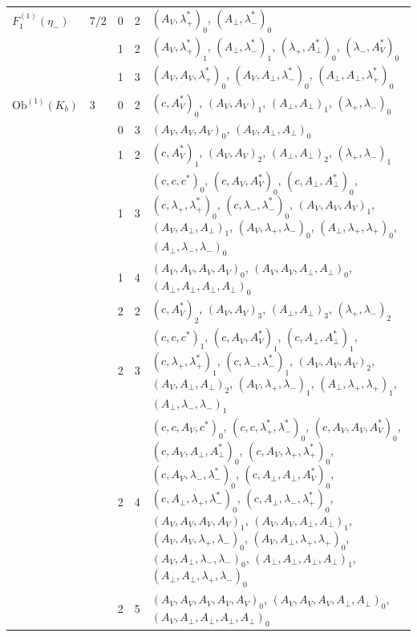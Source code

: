 \documentclass[11pt]{article}
\numberwithin{equation}{section}
\theoremstyle{plain}
\theoremstyle{definition}
\newcommand{\Ob}{\mathrm{Ob}}
\begin{document}
{\begin{longtable}{>{\raggedright}p{2.3cm}|p{0.6cm}|p{0.25cm}|p{0.25cm}|>{\raggedright\arraybackslash}p{11.6cm}}
\hline
$F_1^{(1)}(\eta_-)$ & $7/2$ & 0 & 2 & $(A_V,\lambda^*_+)_{0}$, $(A_\perp,\lambda^*_-)_{0}$ \\
 &  & 1 & 2 & $(A_V,\lambda^*_+)_{1}$, $(A_\perp,\lambda^*_-)_{1}$, $(\lambda_+,A^*_\perp)_{0}$, $(\lambda_-,A^*_V)_{0}$ \\
 &  & 1 & 3 & $(A_V,A_V,\lambda^*_+)_{0}$, $(A_V,A_\perp,\lambda^*_-)_{0}$, $(A_\perp,A_\perp,\lambda^*_+)_{0}$ \\
\hline
$\Ob^{(1)}(K_b)$ & $3$ & 0 & 2 & $(c,A^*_V)_{0}$, $(A_V,A_V)_{1}$, $(A_\perp,A_\perp)_{1}$, $(\lambda_+,\lambda_-)_{0}$ \\
 &  & 0 & 3 & $(A_V,A_V,A_V)_{0}$, $(A_V,A_\perp,A_\perp)_{0}$ \\
 &  & 1 & 2 & $(c,A^*_V)_{1}$, $(A_V,A_V)_{2}$, $(A_\perp,A_\perp)_{2}$, $(\lambda_+,\lambda_-)_{1}$ \\
 &  & 1 & 3 & $(c,c,c^*)_{0}$, $(c,A_V,A^*_V)_{0}$, $(c,A_\perp,A^*_\perp)_{0}$, $(c,\lambda_+,\lambda^*_+)_{0}$, $(c,\lambda_-,\lambda^*_-)_{0}$, $(A_V,A_V,A_V)_{1}$, $(A_V,A_\perp,A_\perp)_{1}$, $(A_V,\lambda_+,\lambda_-)_{0}$, $(A_\perp,\lambda_+,\lambda_+)_{0}$, $(A_\perp,\lambda_-,\lambda_-)_{0}$ \\
 &  & 1 & 4 & $(A_V,A_V,A_V,A_V)_{0}$, $(A_V,A_V,A_\perp,A_\perp)_{0}$, $(A_\perp,A_\perp,A_\perp,A_\perp)_{0}$ \\
 &  & 2 & 2 & $(c,A^*_V)_{2}$, $(A_V,A_V)_{3}$, $(A_\perp,A_\perp)_{3}$, $(\lambda_+,\lambda_-)_{2}$ \\
 &  & 2 & 3 & $(c,c,c^*)_{1}$, $(c,A_V,A^*_V)_{1}$, $(c,A_\perp,A^*_\perp)_{1}$, $(c,\lambda_+,\lambda^*_+)_{1}$, $(c,\lambda_-,\lambda^*_-)_{1}$, $(A_V,A_V,A_V)_{2}$, $(A_V,A_\perp,A_\perp)_{2}$, $(A_V,\lambda_+,\lambda_-)_{1}$, $(A_\perp,\lambda_+,\lambda_+)_{1}$, $(A_\perp,\lambda_-,\lambda_-)_{1}$ \\
 &  & 2 & 4 & $(c,c,A_V,c^*)_{0}$, $(c,c,\lambda^*_+,\lambda^*_-)_{0}$, $(c,A_V,A_V,A^*_V)_{0}$, $(c,A_V,A_\perp,A^*_\perp)_{0}$, $(c,A_V,\lambda_+,\lambda^*_+)_{0}$, $(c,A_V,\lambda_-,\lambda^*_-)_{0}$, $(c,A_\perp,A_\perp,A^*_V)_{0}$, $(c,A_\perp,\lambda_+,\lambda^*_-)_{0}$, $(c,A_\perp,\lambda_-,\lambda^*_+)_{0}$, $(A_V,A_V,A_V,A_V)_{1}$, $(A_V,A_V,A_\perp,A_\perp)_{1}$, $(A_V,A_V,\lambda_+,\lambda_-)_{0}$, $(A_V,A_\perp,\lambda_+,\lambda_+)_{0}$, $(A_V,A_\perp,\lambda_-,\lambda_-)_{0}$, $(A_\perp,A_\perp,A_\perp,A_\perp)_{1}$, $(A_\perp,A_\perp,\lambda_+,\lambda_-)_{0}$ \\
 &  & 2 & 5 & $(A_V,A_V,A_V,A_V,A_V)_{0}$, $(A_V,A_V,A_V,A_\perp,A_\perp)_{0}$, $(A_V,A_\perp,A_\perp,A_\perp,A_\perp)_{0}$ \\

\end{longtable}}
\end{document}
